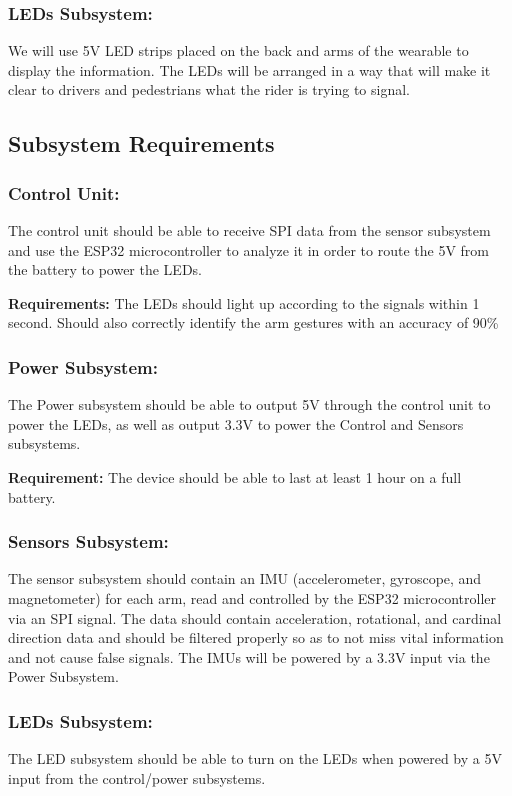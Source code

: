 \documentclass[12pt]{article}
\begin{document}
    \subsubsection{LEDs Subsystem:} 
    We will use 5V LED strips placed on the back and arms of the 
    wearable to display the information. The LEDs will be arranged 
    in a way that will make it clear to drivers and pedestrians
     what the rider is trying to signal.


\subsection{Subsystem Requirements}

\subsubsection{Control Unit:} 
The control unit should be able to receive SPI data from the 
sensor subsystem and use the ESP32 microcontroller to analyze 
it in order to route the 5V from the battery to power the LEDs. 

\textbf{Requirements:} The LEDs should light up according to the signals within 1 second.
Should also correctly identify the arm gestures with an accuracy of 90\%

\subsubsection{Power Subsystem:} 
The Power subsystem should be able to output 5V through the control unit to power the LEDs, as well as output 3.3V to power the Control and Sensors subsystems. 

\textbf{Requirement:} The device should be able to last at least 1 hour on a full battery.

\subsubsection{Sensors Subsystem:}
The sensor subsystem should contain an IMU (accelerometer, gyroscope, and magnetometer) for each arm, read and controlled by the ESP32 microcontroller via an SPI signal. The data should contain acceleration, rotational, and cardinal direction data and should be filtered properly so as to not miss vital information and not cause false signals. The IMUs will be powered by a 3.3V input via the Power Subsystem.

\subsubsection{LEDs Subsystem:} 
The LED subsystem should be able to turn on the LEDs when powered by a 5V input from the control/power subsystems.
\end{document}
